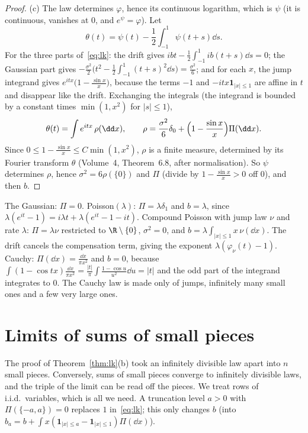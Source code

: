 \begin{proof}
(c) The law determines $\varphi$, hence its continuous logarithm, which is $\psi$ (it is continuous, vanishes at $0$, and $e^\psi=\varphi$). Let
\[
\theta(t)=\psi(t)-\frac12\int_{-1}^1\psi(t+s)\dd s.
\]
For the three parts of~\eqref{eq:lk}: the drift gives $ibt-\frac12\int_{-1}^1ib(t+s)\dd s=0$; the Gaussian part gives
$-\frac{\sigma^2}2\bigl(t^2-\frac12\int_{-1}^1(t+s)^2\dd s\bigr)=\frac{\sigma^2}6$; and for each $x$, the jump integrand gives $e^{itx}\bigl(1-\frac{\sin x}x\bigr)$, because the
terms $-1$ and $-itx\mathbf 1_{|x|\le1}$ are affine in $t$ and disappear like the drift. Exchanging the integrals (the integrand is bounded by a constant times
$\min(1,x^2)$ for $|s|\le1$),
\[
\theta(t)=\int e^{itx}\,\rho(\dd x),\qquad\rho=\frac{\sigma^2}6\delta_0+\Bigl(1-\frac{\sin x}x\Bigr)\Pi(\dd x).
\]
Since $0\le1-\frac{\sin x}x\le C\min(1,x^2)$, $\rho$ is a finite measure, determined by its Fourier transform $\theta$ (Volume~4, Theorem~6.8, after normalisation).
So $\psi$ determines $\rho$, hence $\sigma^2=6\rho(\{0\})$ and $\Pi$ (divide by $1-\frac{\sin x}x>0$ off $0$), and then $b$.
\end{proof}

\begin{example}\label{ex:lkexamples}
The Gaussian: $\Pi=0$. Poisson$(\lambda)$: $\Pi=\lambda\delta_1$ and $b=\lambda$, since $\lambda(e^{it}-1)=i\lambda t+\lambda(e^{it}-1-it)$. Compound Poisson with jump law $\nu$ and rate $\lambda$: $\Pi=\lambda\nu$ restricted to $\R\setminus\{0\}$, $\sigma^2=0$, and $b=\lambda\int_{|x|\le1}x\,\nu(\dd x)$. The drift cancels the compensation term, giving the exponent $\lambda(\varphi_\nu(t)-1)$. Cauchy: $\Pi(\dd x)=\frac{\dd x}{\pi x^2}$ and $b=0$, because
$\int(1-\cos tx)\frac{\dd x}{\pi x^2}=\frac{|t|}\pi\int\frac{1-\cos u}{u^2}\dd u=|t|$ and the odd part of the integrand integrates to $0$. The Cauchy law is
made only of jumps, infinitely many small ones and a few very large ones.
\end{example}

\section{Limits of sums of small pieces}

The proof of Theorem~\ref{thm:lk}(b) took an infinitely divisible law apart into $n$ small pieces. Conversely, sums of small pieces converge to
infinitely divisible laws, and the triple of the limit can be read off the pieces. We treat rows of i.i.d.\ variables, which is all we need. A truncation
level $a>0$ with $\Pi(\{-a,a\})=0$ replaces $1$ in~\eqref{eq:lk}; this only changes $b$ (into $b_a=b+\int x(\mathbf 1_{|x|\le a}-\mathbf 1_{|x|\le1})\Pi(\dd x)$).

